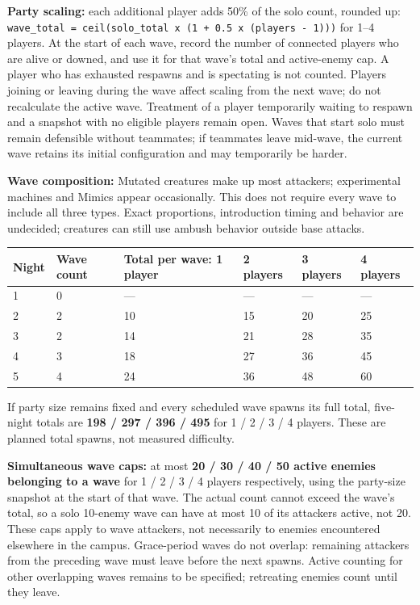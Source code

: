 \textbf{Party scaling:} each additional player adds 50\% of the solo count, rounded up: \texttt{wave\_total = ceil(solo\_total  x  (1 + 0.5  x  (players - 1)))} for 1--4 players. At the start of each wave, record the number of connected players who are alive or downed, and use it for that wave's total and active-enemy cap. A player who has exhausted respawns and is spectating is not counted. Players joining or leaving during the wave affect scaling from the next wave; do not recalculate the active wave. Treatment of a player temporarily waiting to respawn and a snapshot with no eligible players remain open. Waves that start solo must remain defensible without teammates; if teammates leave mid-wave, the current wave retains its initial configuration and may temporarily be harder.

\textbf{Wave composition:} Mutated creatures make up most attackers; experimental machines and Mimics appear occasionally. This does not require every wave to include all three types. Exact proportions, introduction timing and behavior are undecided; creatures can still use ambush behavior outside base attacks.

\begin{longtable}{@{}p{}p{}p{}p{}p{}p{}@{}}
\toprule
\textbf{Night} & \textbf{Wave count} & \textbf{Total per wave: 1 player} & \textbf{2 players} & \textbf{3 players} & \textbf{4 players} \\ \midrule\endhead
1 & 0 & --- & --- & --- & --- \\
2 & 2 & 10 & 15 & 20 & 25 \\
3 & 2 & 14 & 21 & 28 & 35 \\
4 & 3 & 18 & 27 & 36 & 45 \\
5 & 4 & 24 & 36 & 48 & 60 \\
\bottomrule
\end{longtable}
If party size remains fixed and every scheduled wave spawns its full total, five-night totals are \textbf{198 / 297 / 396 / 495} for 1 / 2 / 3 / 4 players. These are planned total spawns, not measured difficulty.

\textbf{Simultaneous wave caps:} at most \textbf{20 / 30 / 40 / 50 active enemies belonging to a wave} for 1 / 2 / 3 / 4 players respectively, using the party-size snapshot at the start of that wave. The actual count cannot exceed the wave's total, so a solo 10-enemy wave can have at most 10 of its attackers active, not 20. These caps apply to wave attackers, not necessarily to enemies encountered elsewhere in the campus. Grace-period waves do not overlap: remaining attackers from the preceding wave must leave before the next spawns. Active counting for other overlapping waves remains to be specified; retreating enemies count until they leave.

